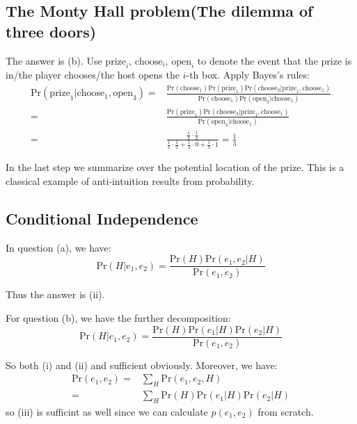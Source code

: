 \documentclass[UTF8]{ctexart}
\begin{document}
\subsection{The Monty Hall problem(The dilemma of three doors)}
The answer is (b).
Use $\text{prize}_{i}\text{, }\text{choose}_{i}\text{, }\text{open}_{i}$ to denote the event that the prize is in/the player chooses/the host opens the $i$-th box.
Apply Bayes's rules:
\begin{align}
\text{Pr}(\text{prize}_{1}|\text{choose}_{1},\text{open}_{3})=&\frac{\text{Pr}(\text{choose}_{1})\text{Pr}(\text{prize}_{1})\text{Pr}(\text{choose}_{3}|\text{prize}_{1},\text{choose}_{1})}{\text{Pr}(\text{choose}_{1})\text{Pr}(\text{open}_{3}|\text{choose}_{1})}\nonumber \\
=&\frac{\text{Pr}(\text{prize}_{1})\text{Pr}(\text{choose}_{3}|\text{prize}_{1},\text{choose}_{1})}{\text{Pr}(\text{open}_{3}|\text{choose}_{1})}\nonumber \\
=&\frac{\frac{1}{3}\cdot\frac{1}{2}}{\frac{1}{3}\cdot \frac{1}{2} + \frac{1}{3}\cdot 0 + \frac{1}{3} \cdot 1}=\frac{1}{3} \nonumber
\end{align}

In the last step we summarize over the potential location of the prize.
This is a classical example of anti-intuition results from probability.


\subsection{Conditional Independence}
In question (a), we have:
$$\text{Pr}(H|e_{1},e_{2})=\frac{\text{Pr}(H)\text{Pr}(e_{1},e_{2}|H)}{\text{Pr}(e_{1},e_{2})}$$

Thus the answer is (ii).

For question (b), we have the further decomposition:
$$\text{Pr}(H|e_{1},e_{2})=\frac{\text{Pr}(H)\text{Pr}(e_{1}|H)\text{Pr}(e_{2}|H)}{\text{Pr}(e_{1},e_{2})}$$

So both (i) and (ii) and sufficient obviously.
Moreover, we have:
\begin{align}
\text{Pr}(e_{1},e_{2})=& \sum_{H}\text{Pr}(e_{1},e_{2},H) \nonumber \\
=&\sum_{H} \text{Pr}(H)\text{Pr}(e_{1}|H)\text{Pr}(e_{2}|H) \nonumber
\end{align}
so (iii) is sufficint as well since we can calculate $p(e_{1},e_{2})$ from scratch.
\end{document}
